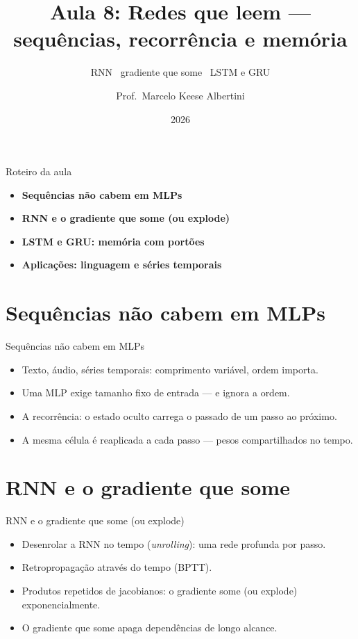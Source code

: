 \documentclass[aspectratio=169, 11pt]{beamer}
\title[Aula 8 — Recorrência]{Aula 8: Redes que leem — sequências, recorrência e memória}
\subtitle[GBC073 — Inteligência Computacional]{RNN \textbullet\ gradiente que some \textbullet\ LSTM e GRU}
\author[Prof.\ Marcelo Albertini]{Prof.\ Marcelo Keese Albertini}
\institute{GBC073 — Inteligência Computacional \textbullet\ Universidade Federal de Uberlândia}
\date{2026}
\begin{document}
\begin{frame}
  \titlepage
\end{frame}

\begin{frame}{Roteiro da aula}
  \begin{itemize}\setlength{\itemsep}{0.5ex}
    \item<1-> \textbf{Sequências não cabem em MLPs}
    \item<2-> \textbf{RNN e o gradiente que some (ou explode)}
    \item<3-> \textbf{LSTM e GRU: memória com portões}
    \item<4-> \textbf{Aplicações: linguagem e séries temporais}
  \end{itemize}
\end{frame}

\section{Sequências não cabem em MLPs}

\begin{frame}{Sequências não cabem em MLPs}
  \begin{itemize}\setlength{\itemsep}{0.4ex}
    \item Texto, áudio, séries temporais: comprimento variável, ordem importa.
    \item Uma MLP exige tamanho fixo de entrada — e ignora a ordem.
    \item A recorrência: o estado oculto carrega o passado de um passo ao
          próximo.
    \item A mesma célula é reaplicada a cada passo — pesos compartilhados no
          tempo.
  \end{itemize}
\end{frame}

\section{RNN e o gradiente que some}

\begin{frame}{RNN e o gradiente que some (ou explode)}
  \begin{itemize}\setlength{\itemsep}{0.4ex}
    \item Desenrolar a RNN no tempo (\emph{unrolling}): uma rede profunda por
          passo.
    \item Retropropagação através do tempo (BPTT).
    \item Produtos repetidos de jacobianos: o gradiente some (ou explode)
          exponencialmente.
    \item O gradiente que some apaga dependências de longo alcance.
  \end{itemize}
\end{frame}
\end{document}

